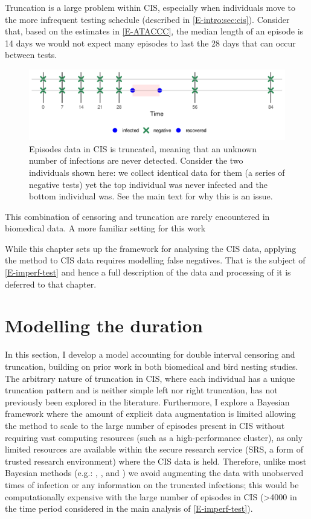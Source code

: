 \documentclass[thesis.tex]{subfiles}
\begin{document}
Truncation is a large problem within CIS, especially when individuals move to the more infrequent testing schedule (described in \cref{E-intro:sec:cis}).
Consider that, based on the estimates in \cref{E-ATACCC}, the median length of an episode is 14 days  we would not expect many episodes to last the 28 days that can occur between tests.
\begin{figure}
  \centering \includegraphics{cis-perfect-testing/truncation}
  \caption{Episodes data in CIS is truncated, meaning that an unknown number of infections are never detected. Consider the two individuals shown here: we collect identical data for them (a series of negative tests) yet the top individual was never infected and the bottom individual was. See the main text for why this is an issue. \label{perf-test:fig:truncation}}
\end{figure}

This combination of censoring and truncation are rarely encountered in biomedical data.
A more familiar setting for this work 

While this chapter sets up the framework for analysing the CIS data, applying the method to CIS data requires modelling false negatives.
That is the subject of \cref{E-imperf-test} and hence a full description of the data and processing of it is deferred to that chapter.

\section{Modelling the duration}\label{perf-test:sec:model}
In this section, I develop a model accounting for double interval censoring and truncation, building on prior work in both biomedical and bird nesting studies.
The arbitrary nature of truncation in CIS, where each individual has a unique truncation pattern and is neither simple left nor right truncation, has not previously been explored in the literature.
Furthermore, I explore a Bayesian framework where the amount of explicit data augmentation is limited allowing the method to scale to the large number of episodes present in CIS without requiring vast computing resources (such as a high-performance cluster), as only limited resources are available within the secure research service (SRS, a form of trusted research environment) where the CIS data is held.
Therefore, unlike most Bayesian methods (e.g.: \textcite{heBayesiana}, \textcite{heBayesian}, and \textcite{caoModeling}) we avoid augmenting the data with unobserved times of infection or any information on the truncated infections; this would be computationally expensive with the large number of episodes in CIS (>4000 in the time period considered in the main analysis of \cref{E-imperf-test}).
\end{document}
